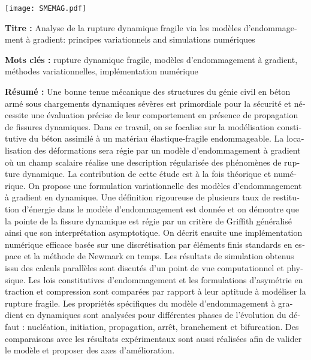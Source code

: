 \pagestyle{empty}

\begin{flushleft}
\texttt{[image: SMEMAG.pdf]}

\vspace{20pt}

\begin{mdframed}
\begin{otherlanguage}{french}
\textbf{Titre :} Analyse de la rupture dynamique fragile via les modèles d'endommagement à gradient: principes variationnels and simulations numériques

\textbf{Mots clés :} rupture dynamique fragile, modèles d'endommagement à gradient, méthodes variationnelles, implémentation numérique

\textbf{Résumé :} Une bonne tenue mécanique des structures du génie civil en béton armé sous chargements dynamiques sévères est primordiale pour la sécurité et nécessite une évaluation précise de leur comportement en présence de propagation de fissures dynamiques. Dans ce travail, on se focalise sur la modélisation constitutive du béton assimilé à un matériau élastique-fragile endommageable. La localisation des déformations sera régie par un modèle d'endommagement à gradient où un champ scalaire réalise une description régularisée des phénomènes de rupture dynamique. La contribution de cette étude est à la fois théorique et numérique. On propose une formulation variationnelle des modèles d'endommagement à gradient en dynamique. Une définition rigoureuse de plusieurs taux de restitution d'énergie dans le modèle d'endommagement est donnée et on démontre que la pointe de la fissure dynamique est régie par un critère de Griffith généralisé ainsi que son interprétation asymptotique. On décrit ensuite une implémentation numérique efficace basée sur une discrétisation par éléments finis standards en espace et la méthode de Newmark en temps. Les résultats de simulation obtenus issu des calculs parallèles sont discutés d'un point de vue computationnel et physique. Les lois constitutives d'endommagement et les formulations d'asymétrie en traction et compression sont comparées par rapport à leur aptitude à modéliser la rupture fragile. Les propriétés spécifiques du modèle d'endommagement à gradient en dynamiques sont analysées pour différentes phases de l'évolution du défaut : nucléation, initiation, propagation, arrêt, branchement et bifurcation. Des comparaisons avec les résultats expérimentaux sont aussi réalisées afin de valider le modèle et proposer des axes d'amélioration.
\end{otherlanguage}
\end{mdframed}


\end{flushleft}
